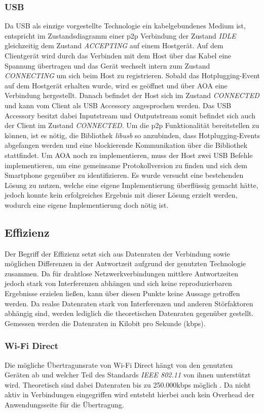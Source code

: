      \subsubsection{USB} Da USB als einzige vorgestellte Technologie ein kabelgebundenes Medium ist, \linebreak entspricht im Zustandsdiagramm einer p2p Verbindung der Zustand {\it IDLE} gleichzeitig dem Zustand {\it ACCEPTING} auf einem Hostgerät. Auf dem Clientgerät wird durch das Verbinden mit dem Host über das Kabel eine Spannung übertragen und das Gerät wechselt intern zum Zustand {\it CONNECTING} um sich beim Host zu registrieren. Sobald das Hotplugging-Event auf dem Hostgerät erhalten wurde, wird es geöffnet und über AOA eine Verbindung hergestellt. Danach befindet der Host sich im Zustand {\it CONNECTED} und kann vom Client als USB Accessory angesprochen werden. Das USB Accessory besitzt dabei Inputstream und Outputstream somit befindet sich auch der Client im Zustand {\it CONNECTED}.
     Um die p2p Funktionalität bereitstellen zu können, ist es nötig, die Bibliothek {\it libusb} so anzubinden, dass Hotplugging-Events abgefangen werden und eine blockierende Kommunikation über die Bibliothek stattfindet. Um AOA noch zu implementieren, muss der Host zwei USB Befehle implementieren, um eine gemeinsame Protokollversion zu finden und sich dem Smartphone gegenüber zu identifizieren. Es wurde versucht eine bestehenden Lösung zu nutzen, welche eine eigene Implementierung überflüssig gemacht hätte, jedoch konnte kein erfolgreiches Ergebnis mit dieser Lösung erzielt werden, wodurch eine eigene Implementierung doch nötig ist.
		
		\subsection{Effizienz}
	   Der Begriff der Effizienz setzt sich aus Datenraten der Verbindung sowie möglichen Differenzen in der Antwortzeit aufgrund der genutzten Technologie zusammen. Da für drahtlose Netzwerkverbindungen mittlere Antwortzeiten jedoch stark von Interferenzen abhängen und sich keine reproduzierbaren Ergebnisse erzielen ließen, kann über diesen Punkte keine Aussage getroffen werden. Da realse Datenraten stark von Interferenzen und anderen Störfaktoren abhängig sind, werden lediglich die theoretischen Datenraten gegenüber gestellt. Gemessen werden die Datenraten in Kilobit pro Sekunde (kbps).

		\subsubsection{Wi-Fi Direct} Die mögliche Übertragunsrate von Wi-Fi Direct hängt von den genutzten Geräten ab und welcher Teil des Standards {\it IEEE 802.11} von ihnen unterstützt wird. Theoretisch sind dabei Datenraten bis zu 250.000kbps möglich \cite{wifiRate}. Da nicht aktiv in Verbindungen eingegriffen wird entsteht hierbei auch kein Overhead der Anwendungsseite für die Übertragung.
		

